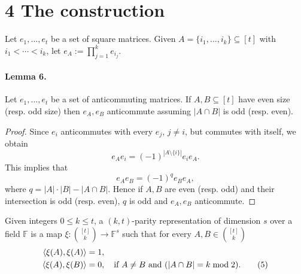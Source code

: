 \section*{4 The construction}
Let $e_1,\ldots,e_t$ be a set of square matrices. Given $A=\{i_1,\ldots,i_k\}\subseteq[t]$ with $i_1<\cdots<i_k$, let $e_A:=\prod_{j=1}^k e_{i_j}$.
\paragraph{Lemma 6.} Let $e_1,\ldots,e_t$ be a set of anticommuting matrices. If $A,B\subseteq[t]$ have even size (resp. odd size) then $e_A,e_B$ anticommute assuming $|A\cap B|$ is odd (resp. even).
\begin{proof}
Since $e_i$ anticommutes with every $e_j$, $j\ne i$, but commutes with itself, we obtain
\[e_Ae_i=(-1)^{|A\setminus\{i\}|}e_i e_A.\]
This implies that
\[e_Ae_B=(-1)^q e_Be_A,\]
where $q=|A|\cdot|B|-|A\cap B|$. Hence if $A,B$ are even (resp. odd) and their intersection is odd (resp. even), $q$ is odd and $e_A,e_B$ anticommute.
\end{proof}
Given integers $0\le k\le t$, a $(k,t)$-parity representation of dimension $s$ over a field $\mathbb F$ is a map $\xi:\binom{[t]}k\to\mathbb F^s$ such that for every $A,B\in\binom{[t]}k$
\begin{align}
\langle\xi(A),\xi(A)\rangle&=1,\notag\\
\langle\xi(A),\xi(B)\rangle&=0,\quad\text{if }A\ne B\text{ and }(|A\cap B|=k\bmod2).\tag{5}
\end{align}
